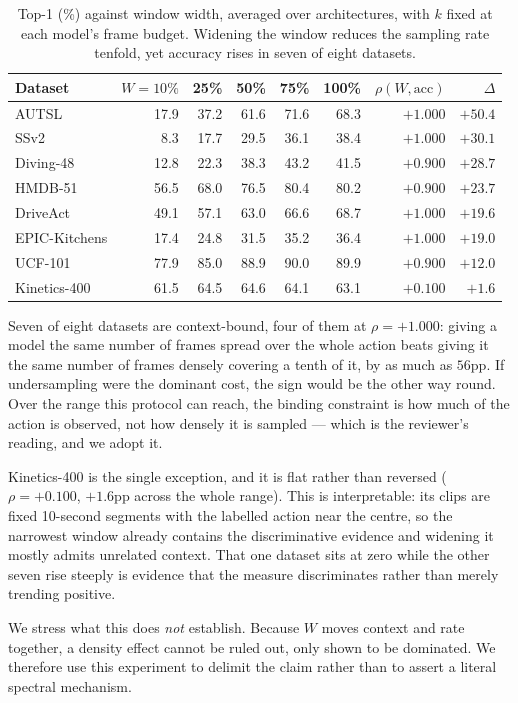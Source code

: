 \documentclass[runningheads]{llncs}
\newcommand{\tabtight}{\setlength{\tabcolsep}{3.5pt}\renewcommand{\arraystretch}{1.12}}
\begin{document}
\begin{table}[!htbp]
\centering
\caption{Top-1 (\%) against window width, averaged over architectures, with $k$
fixed at each model's frame budget. Widening the window reduces the sampling
rate tenfold, yet accuracy rises in seven of eight datasets.}
\label{tab:sup_span}
\scriptsize\tabtight
\begin{tabular}{l rrrrr r r}
\toprule
Dataset & $W{=}10\%$ & 25\% & 50\% & 75\% & 100\% & $\rho(W,\mathrm{acc})$ & $\Delta$ \\
\midrule
AUTSL         & 17.9 & 37.2 & 61.6 & 71.6 & 68.3 & $+1.000$ & $+50.4$ \\
SSv2          &  8.3 & 17.7 & 29.5 & 36.1 & 38.4 & $+1.000$ & $+30.1$ \\
Diving-48     & 12.8 & 22.3 & 38.3 & 43.2 & 41.5 & $+0.900$ & $+28.7$ \\
HMDB-51       & 56.5 & 68.0 & 76.5 & 80.4 & 80.2 & $+0.900$ & $+23.7$ \\
DriveAct      & 49.1 & 57.1 & 63.0 & 66.6 & 68.7 & $+1.000$ & $+19.6$ \\
EPIC-Kitchens & 17.4 & 24.8 & 31.5 & 35.2 & 36.4 & $+1.000$ & $+19.0$ \\
UCF-101       & 77.9 & 85.0 & 88.9 & 90.0 & 89.9 & $+0.900$ & $+12.0$ \\
\midrule
Kinetics-400  & 61.5 & 64.5 & 64.6 & 64.1 & 63.1 & $+0.100$ & $+1.6$ \\
\bottomrule
\end{tabular}
\end{table}

Seven of eight datasets are context-bound, four of them at $\rho=+1.000$: giving
a model the same number of frames spread over the whole action beats giving it
the same number of frames densely covering a tenth of it, by as much as $56$pp.
If undersampling were the dominant cost, the sign would be the other way round.
Over the range this protocol can reach, the binding constraint is how much of
the action is observed, not how densely it is sampled --- which is the reviewer's
reading, and we adopt it.

Kinetics-400 is the single exception, and it is flat rather than reversed
($\rho=+0.100$, $+1.6$pp across the whole range). This is interpretable: its
clips are fixed 10-second segments with the labelled action near the centre, so
the narrowest window already contains the discriminative evidence and widening it
mostly admits unrelated context. That one dataset sits at zero while the other
seven rise steeply is evidence that the measure discriminates rather than merely
trending positive.

We stress what this does \emph{not} establish. Because $W$ moves context and
rate together, a density effect cannot be ruled out, only shown to be dominated.
We therefore use this experiment to delimit the claim rather than to assert a
literal spectral mechanism.

\color{black}



\end{document}
